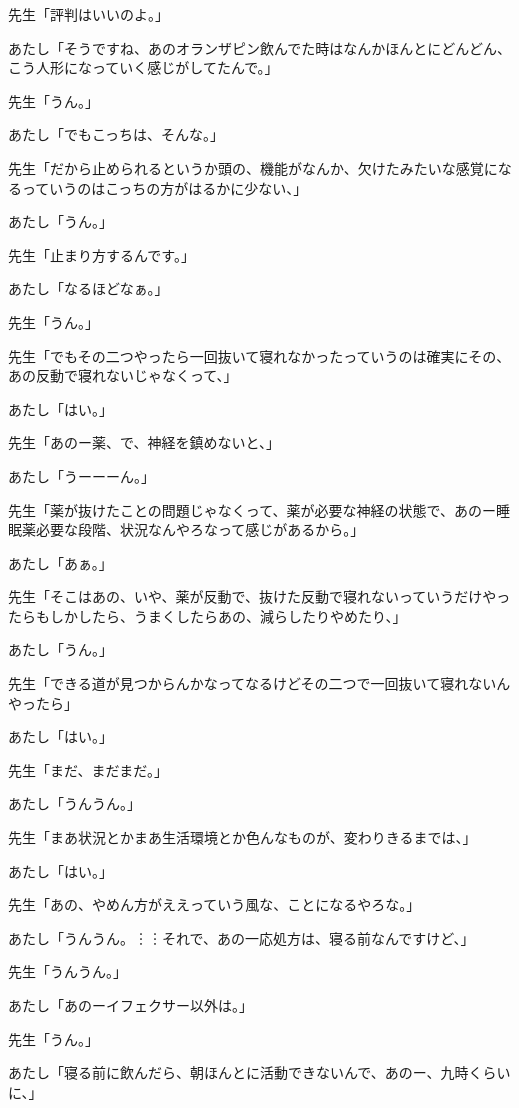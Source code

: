 \documentclass[b5j,twoside,twocolumn]{utarticle}
\begin{document}
\begin{description}
\item 先生「評判はいいのよ。」
\item あたし「そうですね、あのオランザピン飲んでた時はなんかほんとにどんどん、こう人形になっていく感じがしてたんで。」
\item 先生「うん。」
\item あたし「でもこっちは、そんな。」
\item 先生「だから止められるというか頭の、機能がなんか、欠けたみたいな感覚になるっていうのはこっちの方がはるかに少ない、」
\item あたし「うん。」
\item 先生「止まり方するんです。」
\item あたし「なるほどなぁ。」
\item 先生「うん。」
\item 先生「でもその二つやったら一回抜いて寝れなかったっていうのは確実にその、あの反動で寝れないじゃなくって、」
\item あたし「はい。」
\item 先生「あのー薬、で、神経を鎮めないと、」
\item あたし「うーーーん。」
\item 先生「薬が抜けたことの問題じゃなくって、薬が必要な神経の状態で、あのー睡眠薬必要な段階、状況なんやろなって感じがあるから。」
\item あたし「あぁ。」
\item 先生「そこはあの、いや、薬が反動で、抜けた反動で寝れないっていうだけやったらもしかしたら、うまくしたらあの、減らしたりやめたり、」
\item あたし「うん。」
\item 先生「できる道が見つからんかなってなるけどその二つで一回抜いて寝れないんやったら」
\item あたし「はい。」
\item 先生「まだ、まだまだ。」
\item あたし「うんうん。」
\item 先生「まあ状況とかまあ生活環境とか色んなものが、変わりきるまでは、」
\item あたし「はい。」
\item 先生「あの、やめん方がええっていう風な、ことになるやろな。」
\item あたし「うんうん。︙︙それで、あの一応処方は、寝る前なんですけど、」
\item 先生「うんうん。」
\item あたし「あのーイフェクサー以外は。」
\item 先生「うん。」
\item あたし「寝る前に飲んだら、朝ほんとに活動できないんで、あのー、九時くらいに、」

\end{description}
\end{document}
